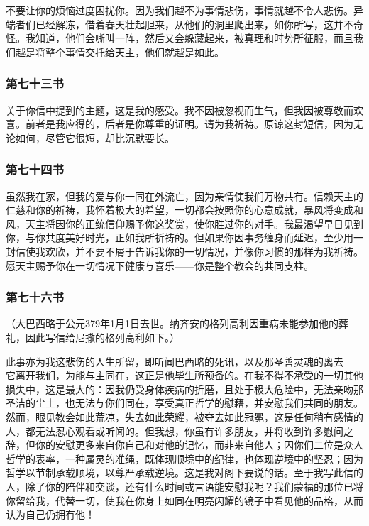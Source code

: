 不要让你的烦恼过度困扰你。因为我们越不为事情悲伤，事情就越不令人悲伤。异端者们已经解冻，借着春天壮起胆来，从他们的洞里爬出来，如你所写，这并不奇怪。我知道，他们会嘶叫一阵，然后又会躲藏起来，被真理和时势所征服，而且我们越是将整个事情交托给天主，他们就越是如此。\par


\subsubsection{第七十三书}

关于你信中提到的主题，这是我的感受。我不因被忽视而生气，但我因被尊敬而欢喜。前者是我应得的，后者是你尊重的证明。请为我祈祷。原谅这封短信，因为无论如何，尽管它很短，却比沉默要长。\par


\subsubsection{第七十四书}

虽然我在家，但我的爱与你一同在外流亡，因为亲情使我们万物共有。信赖天主的仁慈和你的祈祷，我怀着极大的希望，一切都会按照你的心意成就，暴风将变成和风，天主将因你的正统信仰赐予你这奖赏，使你胜过你的对手。我最渴望早日见到你，与你共度美好时光，正如我所祈祷的。但如果你因事务缠身而延迟，至少用一封信使我欢欣，并不要不屑于告诉我你的一切情况，并像你习惯的那样为我祈祷。愿天主赐予你在一切情况下健康与喜乐——你是整个教会的共同支柱。\par


\subsubsection{第七十六书}

（大巴西略于公元379年1月1日去世。纳齐安的格列高利因重病未能参加他的葬礼，因此写信给尼撒的格列高利如下。）\par

此事亦为我这悲伤的人生所留，即听闻巴西略的死讯，以及那圣善灵魂的离去——它离开我们，为能与主同在，这正是他毕生所预备的。在我不得不承受的一切其他损失中，这是最大的：因我仍受身体疾病的折磨，且处于极大危险中，无法亲吻那圣洁的尘土，也无法与你们同在，享受真正哲学的慰藉，并安慰我们共同的朋友。然而，眼见教会如此荒凉，失去如此荣耀，被夺去如此冠冕，这是任何稍有感情的人，都无法忍心观看或听闻的。但我想，你虽有许多朋友，并将收到许多慰问之辞，但你的安慰更多来自你自己和对他的记忆，而非来自他人；因你们二位是众人哲学的表率，一种属灵的准绳，既体现顺境中的纪律，也体现逆境中的坚忍；因为哲学以节制承载顺境，以尊严承载逆境。这是我对阁下要说的话。至于我写此信的人，除了你的陪伴和交谈，还有什么时间或言语能安慰我呢？我们蒙福的那位已将你留给我，代替一切，使我在你身上如同在明亮闪耀的镜子中看见他的品格，从而认为自己仍拥有他！\par

